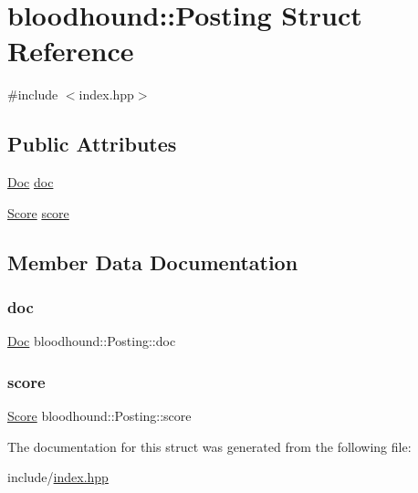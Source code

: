 \hypertarget{structbloodhound_1_1Posting}{}\section{bloodhound\+:\+:Posting Struct Reference}
\label{structbloodhound_1_1Posting}


{\ttfamily \#include $<$index.\+hpp$>$}

\subsection*{Public Attributes}
\begin{DoxyCompactItemize}
\item 
\mbox{\hyperlink{structbloodhound_1_1Doc}{Doc}} \mbox{\hyperlink{structbloodhound_1_1Posting_ae39f120507b708385e754c693109e384}{doc}}
\item 
\mbox{\hyperlink{structbloodhound_1_1Score}{Score}} \mbox{\hyperlink{structbloodhound_1_1Posting_afcdc4c2d2486c04feee39077122e1622}{score}}
\end{DoxyCompactItemize}


\subsection{Member Data Documentation}
\mbox{\label{structbloodhound_1_1Posting_ae39f120507b708385e754c693109e384}} 
\subsubsection{\texorpdfstring{doc}{doc}}
{\footnotesize\ttfamily \mbox{\hyperlink{structbloodhound_1_1Doc}{Doc}} bloodhound\+::\+Posting\+::doc}

\mbox{\label{structbloodhound_1_1Posting_afcdc4c2d2486c04feee39077122e1622}} 
\subsubsection{\texorpdfstring{score}{score}}
{\footnotesize\ttfamily \mbox{\hyperlink{structbloodhound_1_1Score}{Score}} bloodhound\+::\+Posting\+::score}



The documentation for this struct was generated from the following file\+:\begin{DoxyCompactItemize}
\item 
include/\mbox{\hyperlink{index_8hpp}{index.\+hpp}}\end{DoxyCompactItemize}
